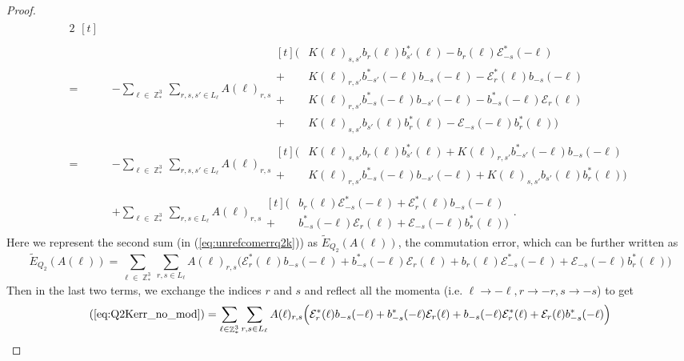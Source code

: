 \documentclass[sn-mathphys,Numbered, a4paper ,nocrop]{sn-jnl}%
\DeclareMathOperator{\Z}{\mathbb{Z}}
\theoremstyle{plain}
\theoremstyle{definition}
\theoremstyle{remark}
\theoremstyle{plain}
\theoremstyle{definition}
\theoremstyle{remark}
\begin{document}
\begin{proof}
\begin{alignat}{2}
\begin{aligned}[t]
    \end{aligned}\\
    = &-\sum\limits_{\ell \in \Z^3_*}\sum\limits_{r,s,s' \in L_{\ell}}A(\ell)_{r,s}\begin{aligned}[t]
        \Big(&K(\ell)_{s,s'}b_{r}(\ell)b^*_{s'}(\ell) - b_{r}(\ell) \mathcal{E}^*_{-s}(-\ell)\\ + &K(\ell)_{r,s'}b^*_{-s'}(-\ell)b_{-s}(-\ell) - \mathcal{E}^*_{r}(\ell)b_{-s}(-\ell)\\+& K(\ell)_{r,s'}b^*_{-s}(-\ell)b_{-s'}(-\ell) -b^*_{-s}(-\ell) \mathcal{E}_{r}(\ell)\\ + &K(\ell)_{s,s'}b_{s'}(\ell)b^*_{r}(\ell) - \mathcal{E}_{-s}(-\ell)b^*_{r}(\ell) \Big)
    \end{aligned}\\
     =&-\sum\limits_{\ell \in \Z^3_*}\sum\limits_{r,s,s' \in L_{\ell}}A(\ell)_{r,s}\begin{aligned}[t]
        \Big(&K(\ell)_{s,s'}b_{r}(\ell)b^*_{s'}(\ell)  + K(\ell)_{r,s'}b^*_{-s'}(-\ell)b_{-s}(-\ell) \\+& K(\ell)_{r,s'}b^*_{-s}(-\ell)b_{-s'}(-\ell) + K(\ell)_{s,s'}b_{s'}(\ell)b^*_{r}(\ell)\Big)
        \end{aligned}\nonumber\\
    &+\sum\limits_{\ell \in \Z^3_*}\sum\limits_{r,s \in L_{\ell}}A(\ell)_{r,s}\begin{aligned}[t]\Big(&b_{r}(\ell) \mathcal{E}^*_{-s}(-\ell) +\mathcal{E}^*_{r}(\ell)b_{-s}(-\ell) \\+&b^*_{-s}(-\ell) \mathcal{E}_{r}(\ell)+ \mathcal{E}_{-s}(-\ell)b^*_{r}(\ell) \Big)\end{aligned}.\label{eq:unrefcomerrq2k}
\end{alignat}
Here we represent the second sum (in (\ref{eq:unrefcomerrq2k})) as $\tilde{E}_{Q_2}(A(\ell))$, the commutation error, which can be further written as
\begin{equation}
    \tilde E_{Q_2}(A(\ell)) = \sum\limits_{\ell \in \Z^3_*}\sum\limits_{r,s \in L_{\ell}}A(\ell)_{r,s}\Big( \mathcal{E}^*_{r}(\ell)b_{-s}(-\ell) +b^*_{-s}(-\ell) \mathcal{E}_{r}(\ell)+b_{r}(\ell) \mathcal{E}^*_{-s}(-\ell)+ \mathcal{E}_{-s}(-\ell)b^*_{r}(\ell) \Big)\label{eq:Q2Kerr_no_mod}
\end{equation}
Then in the last two terms, we exchange the indices $r$ and $s$ and reflect all the momenta (i.e. $\ell\rightarrow -\ell,r\rightarrow -r,s\rightarrow -s$) to get
\begin{align}
    (\ref{eq:Q2Kerr_no_mod})&=\sum\limits_{\ell \in \Z^3_*}\sum\limits_{r,s \in L_{\ell}}A(\ell)_{r,s}\Big( \mathcal{E}^*_{r}(\ell)b_{-s}(-\ell) +b^*_{-s}(-\ell) \mathcal{E}_{r}(\ell)+b_{-s}(-\ell) \mathcal{E}^*_{r}(\ell)+ \mathcal{E}_{r}(\ell)b^*_{-s}(-\ell) \Big)\\

\end{align}
\end{proof}
\end{document}
